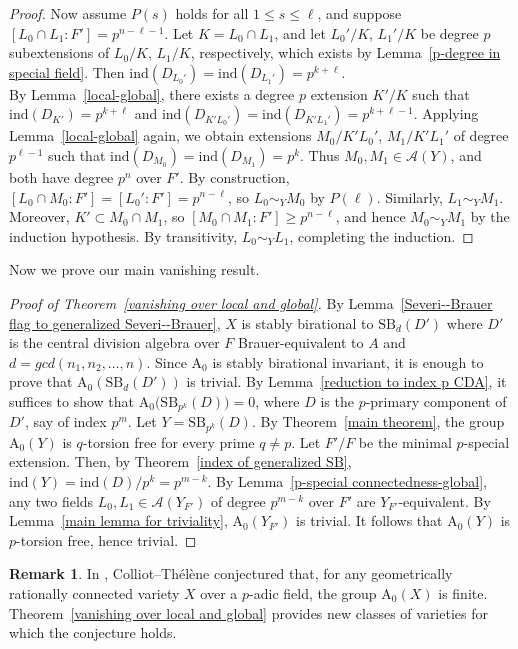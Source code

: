 \documentclass[10pt]{amsart}
\theoremstyle{plain}
\theoremstyle{definition}
\newtheorem{remark}[thm]{Remark}
\begin{document}
\begin{proof}
Now assume \(P(s)\) holds for all \(1 \le s \le \ell\), and suppose \([L_0 \cap L_1 : F'] = p^{n-\ell-1}\). Let \(K=L_0 \cap L_1\), and let \(L_0'/K\), \(L_1'/K\) be degree \(p\) subextensions of \(L_0/K\), \(L_1/K\), respectively, which exists by Lemma~\ref{p-degree in special field}. Then \(\mathrm{ind}(D_{L_0'})=\mathrm{ind}(D_{L_1'})=p^{k+\ell}\).\\ By Lemma~\ref{local-global}, there exists a degree \(p\) extension \(K'/K\) such that \(\mathrm{ind}(D_{K'})=p^{k+\ell}\) and \(\mathrm{ind}(D_{K' L_0'})=\mathrm{ind}(D_{K' L_1'})=p^{k+\ell-1}\). Applying Lemma~\ref{local-global} again, we obtain extensions \(M_0/K' L_0'\), \(M_1/K' L_1'\) of degree \(p^{\ell-1}\) such that \(\mathrm{ind}(D_{M_0})=\mathrm{ind}(D_{M_1})=p^k\). Thus \(M_0, M_1 \in \mathcal{A}(Y)\), and both have degree \(p^n\) over \(F'\). By construction, \([L_0 \cap M_0 : F'] = [L_0':F']= p^{n-\ell}\), so \(L_0 \sim_Y M_0\) by \(P(\ell)\). Similarly, \(L_1 \sim_Y M_1\). Moreover, \(K' \subset M_0 \cap M_1\), so \([M_0 \cap M_1 : F'] \ge p^{n-\ell}\), and hence \(M_0 \sim_Y M_1\) by the induction hypothesis. By transitivity, \(L_0 \sim_Y L_1\), completing the induction.
\end{proof}

Now we prove our main vanishing result.

\begin{proof}[Proof of Theorem~\ref{vanishing over local and global}]
By Lemma~\ref{Severi--Brauer flag to generalized Severi--Brauer}, \(X\) is stably birational to \(\mathrm{SB}_d(D')\) where \(D'\) is the central division algebra over \(F\) Brauer-equivalent to \(A\) and \(d =gcd(n_1,n_2,\dots,n)\). Since \(\mathrm{A_0}\) is stably birational invariant, it is enough to prove that \(\mathrm{A_0}(\mathrm{SB}_d(D'))\) is trivial. By Lemma~\ref{reduction to index p CDA}, it suffices to show that \(\mathrm{A_0}\bigl(\mathrm{SB}_{p^k}(D)\bigr)=0\), where \(D\) is the \(p\)-primary component of \(D'\), say of index \(p^m\). Let \(Y = \mathrm{SB}_{p^k}(D)\). By Theorem~\ref{main theorem}, the group \(\mathrm{A_0}(Y)\) is \(q\)-torsion free for every prime \(q \neq p\). Let \(F'/F\) be the minimal \(p\)-special extension. Then, by Theorem~\ref{index of generalized SB}, \(\mathrm{ind}(Y)=\mathrm{ind}(D)/{p^k}=p^{m-k}\). By Lemma~\ref{p-special connectedness-global}, any two fields \(L_0, L_1 \in \mathcal{A}(Y_{F'})\) of degree \(p^{m-k}\) over \(F'\) are \(Y_{F'}\)-equivalent. By Lemma~\ref{main lemma for triviality}, \(\mathrm{A_0}(Y_{F'})\) is trivial. It follows that \(\mathrm{A_0}(Y)\) is \(p\)-torsion free, hence trivial.
\end{proof}

\begin{remark}
In \cite{CTCONJ}, Colliot--Th\'{e}l\`ene conjectured that, for any geometrically rationally connected variety \(X\) over a \(p\)-adic field, the group \(\mathrm{A_0}(X)\) is finite. Theorem~\ref{vanishing over local and global} provides new classes of varieties for which the conjecture holds.
\end{remark}




    
	
\end{document}
